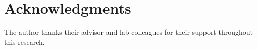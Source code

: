 \chapter{Acknowledgments}

The author thanks their advisor and lab colleagues for their support
throughout this research.
